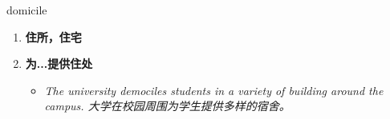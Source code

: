 
\begin{frame}
{\huge domicile}
\begin{center}
\begin{enumerate}\Large
  \item \textbf{住所，住宅}
  \item \textbf{为...提供住处}
  \begin{itemize}
    \item \em{\Large{The university demociles students in a variety of building around the campus. 大学在校园周围为学生提供多样的宿舍。}}
  \end{itemize}
\end{enumerate}
\end{center}
\end{frame}
